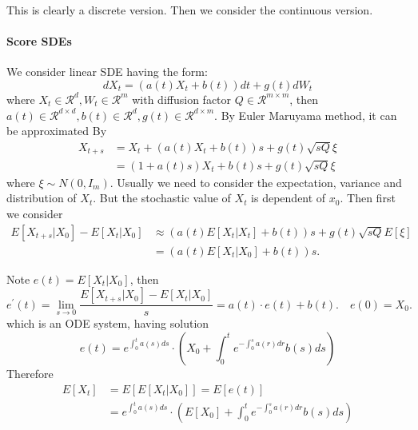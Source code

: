 
This is clearly a discrete version. Then we consider the continuous version.
\paragraph{Score SDEs}
We consider linear SDE having the form:
\begin{equation}
    dX_t = (a(t)X_t + b(t))dt + g(t)dW_t
\end{equation}
where $X_t\in \mathcal{R}^d, W_t\in \mathcal{R}^m$ with diffusion factor $Q\in \mathcal{R}^{m\times m}$, then $a(t)\in \mathcal{R}^{d\times d}, b(t)\in \mathcal{R}^d, g(t)\in \mathcal{R}^{d\times m}$. 
By Euler Maruyama method, it can be approximated By
\begin{equation}
    \begin{aligned}
        X_{t+s}&=X_t + (a(t)X_t + b(t))s+g(t)\sqrt{sQ}\xi\\
        &=(1+a(t)s)X_t + b(t)s + g(t)\sqrt{sQ}\xi
    \end{aligned}
\end{equation}
where $\xi\sim N(0, I_m)$. Usually we need to consider the expectation, variance and distribution of $X_t$. But the stochastic value of $X_t$ is dependent of $x_0$. Then first we consider
\begin{equation}
    \begin{aligned}
    E\left[X_{t+s} | X_{0}\right]-E\left[X_{t} | X_{0}\right] & \approx\left(a(t) E\left[X_{t} | X_{t}\right]+b(t)\right) s+g(t) \sqrt{sQ} E[\xi] \\
    & =\left(a(t) E\left[X_{t} | X_{0}\right]+b(t)\right) s .
    \end{aligned}
\end{equation}


Note  $e(t)=E\left[X_{t} | X_{0}\right]$, then
\begin{equation}
    e^{\prime}(t)=\lim _{s \rightarrow 0} \frac{E\left[X_{t+s} | X_{0}\right]-E\left[X_{t} | X_{0}\right]}{s}=a(t) \cdot e(t)+b(t) . \quad e(0)=X_{0} .    
\end{equation}
which is an ODE system, having solution
\begin{equation}
    e(t)=e^{\int_{0}^{t} a(s) d s}\cdot\left(X_{0}+\int_{0}^{t} e^{-\int_{0}^{s} a(r) d r} b(s) d s\right)
\end{equation}
Therefore
\begin{equation}
    \begin{aligned}
    E\left[X_{t}\right] & =E\left[E\left[X_{t} | X_{0}\right]\right]=E[e(t)] \\
    & =e^{\int_{0}^{t} a(s) d s}\cdot\left(E\left[X_{0}\right]+\int_{0}^{t} e^{-\int_{0}^{s} a(r) d r} b(s) d s\right) 
    \end{aligned}
\end{equation}

